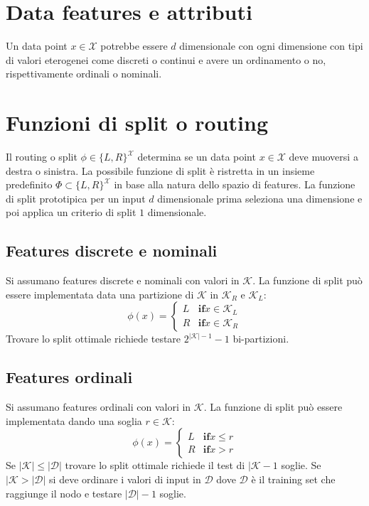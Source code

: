 \section{Data features e attributi}
Un data point $x\in\mathcal{X}$ potrebbe essere $d$ dimensionale con ogni dimensione con tipi di valori eterogenei come discreti o continui e avere un ordinamento o no, rispettivamente ordinali o nominali.

\section{Funzioni di split o routing}
Il routing o split $\phi\in\{L,R\}^{\mathcal{X}}$ determina se un data point $x\in\mathcal{X}$ deve muoversi a destra o sinistra.
La possibile funzione di split \`e ristretta in un insieme predefinito $\Phi\subset\{L,R\}^\mathcal{X}$ in base alla natura dello spazio di features.
La funzione di split prototipica per un input $d$ dimensionale prima seleziona una dimensione e poi applica un criterio di split $1$ dimensionale.

	\subsection{Features discrete e nominali}
	Si assumano features discrete e nominali con valori in $\mathcal{K}$.
	La funzione di split pu\`o essere implementata data una partizione di $\mathcal{K}$ in $\mathcal{K}_R$ e $\mathcal{K}_L$:
	$$\phi(x) = \begin{cases}L &\mathbf{if} x\in\mathcal{K}_L\\
		 								  R &\mathbf{if} x\in\mathcal{K}_R
				 \end{cases}$$
	Trovare lo split ottimale richiede testare $2^{|\mathcal{K}|-1}-1$ bi-partizioni.

	\subsection{Features ordinali}
	Si assumano features ordinali con valori in $\mathcal{K}$.
	La funzione di split pu\`o essere implementata dando una soglia $r\in\mathcal{K}$:
	$$\phi(x) = \begin{cases}L &\mathbf{if} x\le r\\
		 								  R &\mathbf{if} x>r
				 \end{cases}$$
	Se $|\mathcal{K}|\le|\mathcal{D}|$ trovare lo split ottimale richiede il test di $|\mathcal{K}-1$ soglie.
	Se $|\mathcal{K}>|\mathcal{D}|$ si deve ordinare i valori di input in $\mathcal{D}$ dove $\mathcal{D}$ \`e il training set che raggiunge il nodo e testare $|\mathcal{D}|-1$ soglie.

